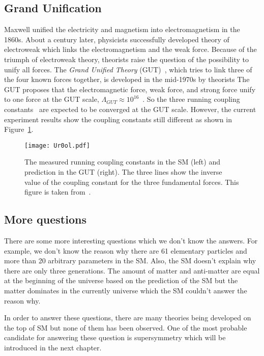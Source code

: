 
\subsection{Grand Unification}
\label{subsec:sm_grand_unification}
Maxwell unified the electricity and magnetism into electromagnetism in the 1860s.
About a century later, physicists successfully developed theory of electroweak which links the electromagnetism and the weak force.
Because of the triumph of electroweak theory, theorists raise the question of the possibility to unify all forces.
The \textit{Grand Unified Theory} (GUT)~\cite{Ross:1985ai}, which tries to link three of the four known forces together, is developed in the mid-1970s by theorists
The GUT proposes that the electromagnetic force, weak force, and strong force unify to one force at the GUT scale, $\Lambda_{GUT} \approx 10^{16}$~{\GeV}.
So the three running coupling constants~\cite{Mohr:2015ccw} are expected to be converged at the GUT scale.
However, the current experiment results show the coupling constants still different as shown in Figure~\ref{fig:sm_coulping_constants}.

\begin{figure}[htbp]
    \begin{center}
        \texttt{[image: Ur0ol.pdf]}
        \caption{The measured running coupling constants in the SM (left) and prediction in the GUT (right).
        The three lines show the inverse value of the coupling constant for the three fundamental forces.
        This figure is taken from~\cite{Ur0ol}.}
        \label{fig:sm_coulping_constants}
    \end{center}
\end{figure}


\subsection{More questions}
\label{subsec:sm_more_questions}
There are some more interesting questions which we don't know the answers.
For example, we don't know the reason why there are 61 elementary particles and more than 20 arbitrary parameters in the SM.
Also, the SM doesn't explain why there are only three generations.
The amount of matter and anti-matter are equal at the beginning of the universe based on the prediction of the SM but the matter dominates in the currently universe which the SM couldn't answer the reason why.

In order to answer these questions, there are many theories being developed on the top of SM but none of them has been observed.
One of the most probable candidate for answering these question is supersymmetry which will be introduced in the next chapter.
